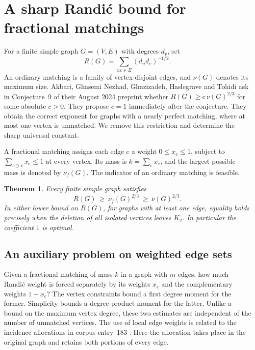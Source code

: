 \documentclass[11pt]{article}
\newtheorem{theorem}{Theorem}[section]
\theoremstyle{remark}\newtheorem{remark}[theorem]{Remark}
\begin{document}
\section{A sharp Randi\'c bound for fractional matchings}\label{graph:section}

For a finite simple graph $G=(V,E)$ with degrees $d_v$, set
\[
 R(G)=\sum_{uv\in E}(d_ud_v)^{-1/2}.
\]
An ordinary matching is a family of vertex-disjoint edges, and $\nu(G)$
denotes its maximum size. Akbari, Ghasemi Nezhad, Ghazizadeh, Haslegrave
and Tohidi ask in Conjecture~9 of their August 2024 preprint
\cite{AGGHT} whether $R(G)\ge c\,\nu(G)^{2/3}$ for some absolute $c>0$.
They propose $c=1$ immediately after the conjecture. They obtain the
correct exponent for graphs with a nearly perfect matching, where at
most one vertex is unmatched. We remove this restriction and determine
the sharp universal constant.

A fractional matching assigns each edge $e$ a weight $0\le x_e\le1$,
subject to $\sum_{e\ni v}x_e\le1$ at every vertex. Its mass is
$k=\sum_e x_e$, and the largest possible mass is denoted by
$\nu_f(G)$. The indicator of an ordinary matching is feasible.

\begin{theorem}\label{graph:main}
Every finite simple graph satisfies
\[
             R(G)\ \ge\ \nu_f(G)^{2/3}\ \ge\ \nu(G)^{2/3}.
\]
In either lower bound on $R(G)$, for graphs with at least one edge,
equality holds precisely when the deletion of all isolated vertices
leaves $K_2$. In particular the coefficient $1$ is optimal.
\end{theorem}

\subsection{An auxiliary problem on weighted edge sets}

Given a fractional matching of mass $k$ in a graph with $m$ edges,
how much Randi\'c weight is forced separately by its weights $x_e$ and
the complementary weights $1-x_e$? The vertex constraints bound a
first degree moment for the former. Simplicity bounds a degree-product
moment for the latter. Unlike a bound on the maximum vertex degree,
these two estimates are independent of the number of unmatched vertices.
The use of local edge weights is related to the incidence allocations
in corpus entry~183 \cite{VMRC}. Here the allocation takes place in the
original graph and retains both portions of every edge.
\end{document}
